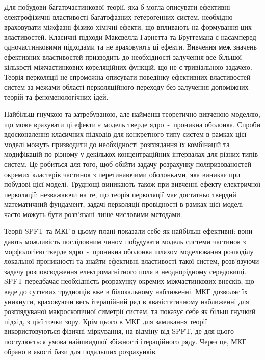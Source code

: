 \documentclass[14pt,twoside]{vakthesis}
\begin{document}
Для побудови багаточастинкової теорії, яка б могла описувати ефективні електрофізичні властивості багатофазних гетерогенних систем, необхідно враховувати міжфазні фізико-хімічні ефекти, що впливають на формування цих властивостей. 
Класичні підходи Максвелла-Гарнетта та Бруггемана є насамперед одночастинковими підходами та не враховують ці ефекти. Вивчення меж значень ефективних властивостей призводить до необхідності залучення все більшої кількості міжчастинкових кореляційних функцій, що не є тривіальною задачею. Теорія перколяції не спроможна описувати поведінку ефективних властивостей систем за межами області перколяційного переходу без залучення допоміжних теорій та феноменологічних ідей. 

Найбільш гнучкою та затребуваною, але найменш теоретично вивченою моделлю, що може врахувати ці ефекти є модель тверде ядро~-~проникна оболонка.
Спроби вдосконалення класичних підходів для конкретного типу систем в рамках цієї моделі можуть призводити до необхідності розглядання їх комбінацій та модифікацій по різному у декількох концентраційних інтервалах для різних типів систем.
Це робиться для того, щоб обійти задачу розрахунку поляризованостей окремих кластерів частинок з перетинаючими оболонками, яка виникає при побудові цієї моделі. 
Труднощі виникають також при вивченні ефекту електричної перколяції: незважаючи на те, що теорія перколяції має достатньо твердий математичний фундамент, задачі перколяції провідності в рамках цієї моделі часто можуть бути розв'язані лише числовими методами. 

Теорії SPFT та МКГ в цьому плані показали себе як найбільш ефективні: вони дають можливість послідовним чином побудувати модель системи частинок з морфологією тверде ядро~-~проникна оболонка шляхом моделювання розподілу локальної проникності та знайти ефективні властивості такої систем, розв'язуючи задачу розповсюдження електромагнітного поля в неоднорідному середовищі.
SPFT передбачає необхідність розрахунку окремих міжчастинкових внесків, що веде до суттєвих труднощів вже в білокальному наближенні. МКГ дозволяє їх уникнути, враховуючи весь ітераційний ряд в квазістатичному наближенні для розглядуваної макроскопічної симетрії  систем, та показує себе як більш гнучкий підхід, з цієї точки зору.
Крім цього в МКГ для замикання теорії використовуються фізичні міркування, на відміну від SPFT, де для цього постулюється умова найшвидшої збіжності ітераційного ряду.
Через це, МКГ обрано в якості бази для подальших розрахунків.


\end{document}
